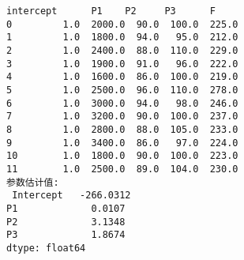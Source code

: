 \documentclass[11pt]{article}
\newcommand{\prompt}[4]{
        {\ttfamily\llap{{\color{#2}[#3]:\hspace{3pt}#4}}\vspace{-\baselineskip}}
    }
\begin{document}
    \begin{Verbatim}[commandchars=\\\{\}]
    intercept      P1    P2     P3      F
0         1.0  2000.0  90.0  100.0  225.0
1         1.0  1800.0  94.0   95.0  212.0
2         1.0  2400.0  88.0  110.0  229.0
3         1.0  1900.0  91.0   96.0  222.0
4         1.0  1600.0  86.0  100.0  219.0
5         1.0  2500.0  96.0  110.0  278.0
6         1.0  3000.0  94.0   98.0  246.0
7         1.0  3200.0  90.0  100.0  237.0
8         1.0  2800.0  88.0  105.0  233.0
9         1.0  3400.0  86.0   97.0  224.0
10        1.0  1800.0  90.0  100.0  223.0
11        1.0  2500.0  89.0  104.0  230.0
参数估计值:
 Intercept   -266.0312
P1             0.0107
P2             3.1348
P3             1.8674
dtype: float64
    \end{Verbatim}
 
            
\prompt{Out}{outcolor}{82}{}
    
\end{document}
